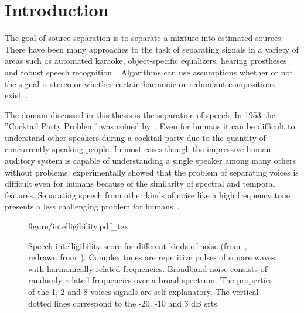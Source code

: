 



%
%
%

\chapter{Introduction}

The goal of source separation is to separate a mixture into estimated sources.
There have been many approaches to the task of separating signals in a variety of areas such as automated karaoke, object-specific equalizers, hearing prostheses and robust speech recognition~\cite{Wang2018}.
Algorithms can use assumptions whether or not the signal is stereo or whether certain harmonic or redundant compositions exist~\cite[p.~1308]{Rafii2018}.

The domain discussed in this thesis is the separation of speech.
In 1953 the ''Cocktail Party Problem'' was coined by~\textcite{Cherry1953}. Even for humans it can be difficult to understand other speakers during a cocktail party due to the quantity of concurrently speaking people. In most cases though the impressive human auditory system is capable of understanding a single speaker among many others without problems.
\textcite{Miller1947,Rosen2013} experimentally showed that the problem of separating voices is difficult even for humans because of the similarity of spectral and temporal features. Separating speech from other kinds of noise like a high frequency tone presents a less challenging problem for humans~\cite[p.~128]{Miller1947}.

\begin{figure}[ht]
	\centering
	{
		\fontsize{8pt}{10pt}\selectfont
		{figure/intelligibility.pdf_tex}
	}
	\caption{Speech intelligibility score for different kinds of noise (from~\cites[p.~2]{Wang2018b}[p.~7]{Wang2006}, redrawn from~\cite{Miller1947}). Complex tones are repetitive pulses of square waves with harmonically related frequencies. Broadband noise consists of randomly related frequencies over a broad spectrum. The properties of the 1, 2 and 8 voices signals are self-explanatory.
		The vertical dotted lines correspond to the -20, -10 and 3 \si{\dB} \glspl{srt}.}
	\label{fig.intelligibility}
\end{figure}

